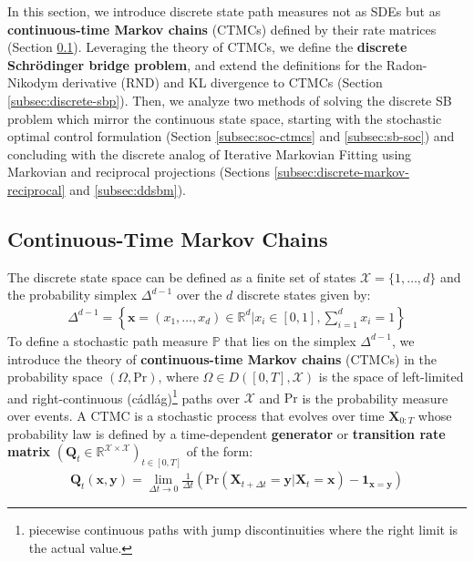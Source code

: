 \documentclass{article}
\newcommand{\boldtext}[1]{\textbf{\textcolor{MyGreen}{#1}}}
\begin{document}
In this section, we introduce discrete state path measures not as SDEs but as \textbf{continuous-time Markov chains} (CTMCs) defined by their rate matrices (Section \ref{subsec:ctmc}). Leveraging the theory of CTMCs, we define the \textbf{discrete Schrödinger bridge problem}, and extend the definitions for the Radon-Nikodym derivative (RND) and KL divergence to CTMCs (Section \ref{subsec:discrete-sbp}). Then, we analyze two methods of solving the discrete SB problem which mirror the continuous state space, starting with the stochastic optimal control formulation (Section \ref{subsec:soc-ctmcs} and \ref{subsec:sb-soc}) and concluding with the discrete analog of Iterative Markovian Fitting using Markovian and reciprocal projections (Sections \ref{subsec:discrete-markov-reciprocal} and \ref{subsec:ddsbm}). 

\subsection{Continuous-Time Markov Chains}
\label{subsec:ctmc}
The discrete state space can be defined as a finite set of states $\mathcal{X}=\{1, \dots, d\}$ and the probability simplex $\Delta^{d-1}$ over the $d$ discrete states given by:
\begin{align}
    \Delta^{d-1}=\left\{\boldsymbol{x}=(x_1, \dots, x_d)\in \mathbb{R}^d\bigg|x_i\in [0,1], \sum_{i=1}^dx_i=1\right\}
\end{align}
To define a stochastic path measure $\mathbb{P}$ that lies on the simplex $\Delta^{d-1}$, we introduce the theory of \boldtext{continuous-time Markov chains} (CTMCs) in the probability space $(\Omega, \text{Pr})$, where $\Omega \in D([0,T], \mathcal{X})$ is the space of left-limited and right-continuous (cádlág)\footnote{piecewise continuous paths with jump discontinuities where the right limit is the actual value.} paths over $\mathcal{X}$ and $\text{Pr}$ is the probability measure over events. A CTMC is a stochastic process that evolves over time $\boldsymbol{X}_{0:T}$ whose probability law is defined by a time-dependent \boldtext{generator} or \boldtext{transition rate matrix} $(\boldsymbol{Q}_t\in \mathbb{R}^{\mathcal{X}\times \mathcal{X}})_{t\in [0,T]}$ of the form:
\begin{align}
    \boldsymbol{Q}_t(\boldsymbol{x},\boldsymbol{y})=\lim_{\Delta t\to 0}\frac{1}{\Delta t}\left(\text{Pr}(\boldsymbol{X}_{t+\Delta t}=\boldsymbol{y}|\boldsymbol{X}_t=\boldsymbol{x})-\boldsymbol{1}_{\boldsymbol{x}=\boldsymbol{y}}\right)
\end{align}
\end{document}
